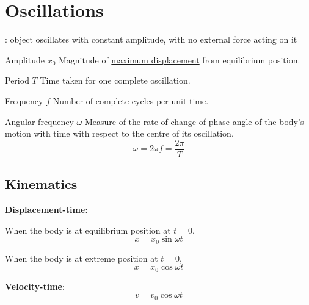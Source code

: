 \section{Oscillations}
: object oscillates with constant amplitude, with no external force acting on it

\begin{defn}{Amplitude $x_0$}{}
Magnitude of \underline{maximum displacement} from equilibrium position. 
\end{defn}

\begin{defn}{Period $T$}{}
Time taken for one complete oscillation. 
\end{defn}

\begin{defn}{Frequency $f$}{}
Number of complete cycles per unit time.
\end{defn}

\begin{defn}{Angular frequency $\omega$}{}
Measure of the rate of change of phase angle of the body's motion with time with respect to the centre of its oscillation.
\begin{equation} \omega = 2 \pi f = \frac{2\pi}{T}\end{equation}
\end{defn}
\pagebreak

\subsection{Kinematics}
\textbf{Displacement-time}:

When the body is at equilibrium position at $t=0$,
\begin{equation} x = x_0 \sin \omega t \end{equation}

\begin{figure}[H]
\centering
{}
\end{figure}

When the body is at extreme position at $t=0$,
\[ x = x_0 \cos \omega t \]

\textbf{Velocity-time}:
\begin{equation} v = v_0 \cos \omega t \end{equation}


